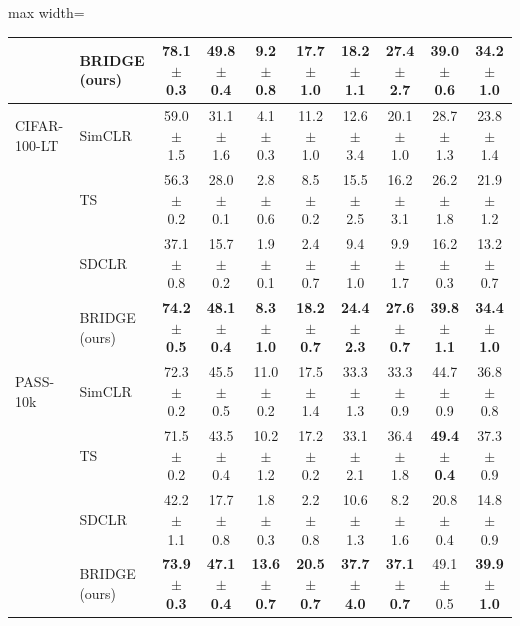 \begin{table}[t]
\begin{adjustbox}{max width=\textwidth}
\begin{tabular}{l l c c c c c c c c}
\rowcolor{blue!10} & BRIDGE (ours) & \textbf{78.1 {\scriptsize$\pm$ 0.3}} & \textbf{49.8 {\scriptsize$\pm$ 0.4}} & \textbf{9.2 {\scriptsize$\pm$ 0.8}} & \textbf{17.7 {\scriptsize$\pm$ 1.0}} & 18.2 {\scriptsize$\pm$ 1.1} & \textbf{27.4 {\scriptsize$\pm$ 2.7}} & \textbf{39.0 {\scriptsize$\pm$ 0.6}} & \textbf{34.2 {\scriptsize$\pm$ 1.0}} \\
\midrule
CIFAR-100-LT & SimCLR & 59.0 {\scriptsize$\pm$ 1.5} & 31.1 {\scriptsize$\pm$ 1.6} & 4.1 {\scriptsize$\pm$ 0.3} & 11.2 {\scriptsize$\pm$ 1.0} & 12.6 {\scriptsize$\pm$ 3.4} & 20.1 {\scriptsize$\pm$ 1.0} & 28.7 {\scriptsize$\pm$ 1.3} & 23.8 {\scriptsize$\pm$ 1.4} \\
 & TS & 56.3 {\scriptsize$\pm$ 0.2} & 28.0 {\scriptsize$\pm$ 0.1} & 2.8 {\scriptsize$\pm$ 0.6} & 8.5 {\scriptsize$\pm$ 0.2} & 15.5 {\scriptsize$\pm$ 2.5} & 16.2 {\scriptsize$\pm$ 3.1} & 26.2 {\scriptsize$\pm$ 1.8} & 21.9 {\scriptsize$\pm$ 1.2} \\
 & SDCLR & 37.1 {\scriptsize$\pm$ 0.8} & 15.7 {\scriptsize$\pm$ 0.2} & 1.9 {\scriptsize$\pm$ 0.1} & 2.4 {\scriptsize$\pm$ 0.7} & 9.4 {\scriptsize$\pm$ 1.0} & 9.9 {\scriptsize$\pm$ 1.7} & 16.2 {\scriptsize$\pm$ 0.3} & 13.2 {\scriptsize$\pm$ 0.7} \\
\rowcolor{blue!10} & BRIDGE (ours) & \textbf{74.2 {\scriptsize$\pm$ 0.5}} & \textbf{48.1 {\scriptsize$\pm$ 0.4}} & \textbf{8.3 {\scriptsize$\pm$ 1.0}} & \textbf{18.2 {\scriptsize$\pm$ 0.7}} & \textbf{24.4 {\scriptsize$\pm$ 2.3}} & \textbf{27.6 {\scriptsize$\pm$ 0.7}} & \textbf{39.8 {\scriptsize$\pm$ 1.1}} & \textbf{34.4 {\scriptsize$\pm$ 1.0}} \\
\midrule
PASS-10k & SimCLR & 72.3 {\scriptsize$\pm$ 0.2} & 45.5 {\scriptsize$\pm$ 0.5} & 11.0 {\scriptsize$\pm$ 0.2} & 17.5 {\scriptsize$\pm$ 1.4} & 33.3 {\scriptsize$\pm$ 1.3} & 33.3 {\scriptsize$\pm$ 0.9} & 44.7 {\scriptsize$\pm$ 0.9} & 36.8 {\scriptsize$\pm$ 0.8} \\
 & TS & 71.5 {\scriptsize$\pm$ 0.2} & 43.5 {\scriptsize$\pm$ 0.4} & 10.2 {\scriptsize$\pm$ 1.2} & 17.2 {\scriptsize$\pm$ 0.2} & 33.1 {\scriptsize$\pm$ 2.1} & 36.4 {\scriptsize$\pm$ 1.8} & \textbf{49.4 {\scriptsize$\pm$ 0.4}} & 37.3 {\scriptsize$\pm$ 0.9} \\
 & SDCLR & 42.2 {\scriptsize$\pm$ 1.1} & 17.7 {\scriptsize$\pm$ 0.8} & 1.8 {\scriptsize$\pm$ 0.3} & 2.2 {\scriptsize$\pm$ 0.8} & 10.6 {\scriptsize$\pm$ 1.3} & 8.2 {\scriptsize$\pm$ 1.6} & 20.8 {\scriptsize$\pm$ 0.4} & 14.8 {\scriptsize$\pm$ 0.9} \\
\rowcolor{blue!10} & BRIDGE (ours) & \textbf{73.9 {\scriptsize$\pm$ 0.3}} & \textbf{47.1 {\scriptsize$\pm$ 0.4}} & \textbf{13.6 {\scriptsize$\pm$ 0.7}} & \textbf{20.5 {\scriptsize$\pm$ 0.7}} & \textbf{37.7 {\scriptsize$\pm$ 4.0}} & \textbf{37.1 {\scriptsize$\pm$ 0.7}} & 49.1 {\scriptsize$\pm$ 0.5} & \textbf{39.9 {\scriptsize$\pm$ 1.0}} \\

\end{tabular}
\end{adjustbox}
\end{table}
